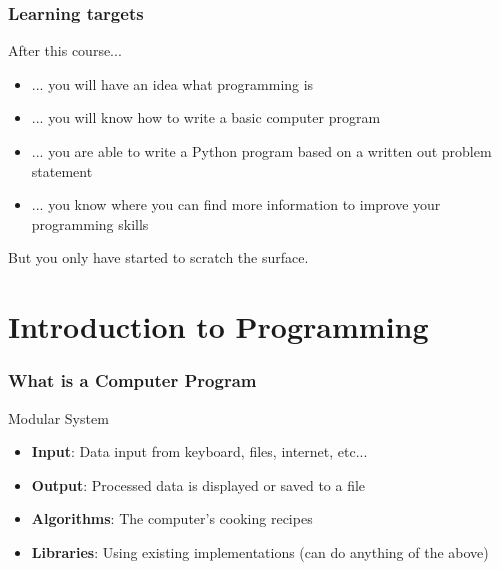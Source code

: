 \documentclass[10pt, a4paper]{beamer} %
\begin{document}

\begin{frame}[c]\frametitle{Learning targets}

	After this course...
	\begin{itemize}
		\item ... you will have an idea what programming is
		\item ... you will know how to write a basic computer program
		\item ... you are able to write a Python program based on a written out
		      problem statement
		\item ... you know where you can find more information to improve your
		      programming skills
	\end{itemize}

	But you only have started to scratch the surface.
\end{frame}


\section{Introduction to Programming} %
\label{sec:introduction_to_programming}

\begin{frame}[c]\frametitle{What is a Computer Program}
	\begin{block}{Modular System}
		\begin{itemize}
			\item \textbf{Input}: Data input from keyboard, files, internet, etc...
			\item \textbf{Output}: Processed data is displayed or saved to a file
			\item \textbf{Algorithms}: The computer's cooking recipes
			\item \textbf{Libraries}: Using existing implementations (can do anything of the above)
		\end{itemize}

	\end{block}
\end{frame}
\end{document}
